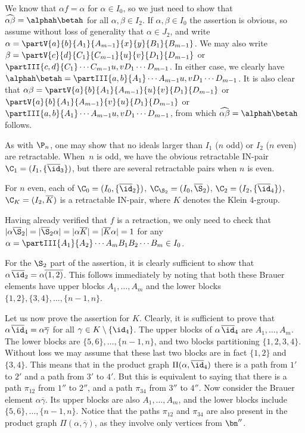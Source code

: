 \pf
We know that $\alpha f=\alpha$ for $\alpha\in I_0$, so we just need to show that $\widehat{\alpha\beta}=\alphah\betah$ for all $\alpha,\beta\in I_2$.
If $\alpha,\beta\in I_0$ the assertion is obvious, so assume without loss of generality that $\alpha\in J_2$,
and write $\alpha = \partV{a}{b}{A_1}{A_{m-1}}{x}{y}{B_1}{B_{m-1}}$.  We may also write $\beta=\partV{c}{d}{C_1}{C_{m-1}}{u}{v}{D_1}{D_{m-1}}$ or $\partIII{c,d}{C_1}\cdots{C_{m-1}}{u,v}{D_1}\cdots{D_{m-1}}$.  In either case, we clearly have $\alphah\betah=\partIII{a,b}{A_1}\cdots{A_{m-1}}{u,v}{D_1}\cdots{D_{m-1}}$.  It is also clear that
$\alpha\beta = \partV{a}{b}{A_1}{A_{m-1}}{u}{v}{D_1}{D_{m-1}}$
or $\partV{a}{b}{A_1}{A_{m-1}}{v}{u}{D_1}{D_{m-1}}$ or~$\partIII{a,b}{A_1}\cdots{A_{m-1}}{u,v}{D_1}\cdots{D_{m-1}}$, from which $\widehat{\alpha\beta}=\alphah\betah$ follows. \epf

As with $\P_n$, one may show that no ideals larger than $I_1$ ($n$ odd) or $I_2$ ($n$ even) are retractable.
%
When~$n$ is odd, we have the obvious retractable IN-pair $\C_1=(I_1,\{\overline\id_3\})$, but there are several retractable pairs when $n$ is even.



\begin{lemma}
\label{BCtriples}
For $n$ even, each of $\C_0=(I_0,\{\overline{\id}_2\})$,
$\C_{\S_2}=(I_0,\overline{\S}_2)$,
$\C_2=(I_2,\{\overline{\id}_4\})$,
$\C_K=(I_2,\overline{K})$
is a retractable IN-pair, where $K$ denotes the Klein 4-group.
\end{lemma}

\pf
Having already verified that $f$ is a retraction, we only need to check that
$|\alpha\overline{\S}_2|=|\overline{\S}_2\alpha|=|\alpha \overline{K}|=|\overline{K}\alpha|=1$ for any
$\alpha=\partIII{A_1}{A_2}\cdots{A_{m}}{B_1}{B_2}\cdots{B_{m}}\in I_0$.

For the $\S_2$ part of the assertion, it is clearly sufficient to show
that $\alpha\;\!\overline{\id}_2=\alpha\overline{(1, 2)}$.
This 
follows immediately by noting that both these Brauer elements have upper blocks $A_1,\dots,A_m$ and the lower blocks $\{1,2\},\{3,4\},\dots,\{n-1,n\}$.

Let us now prove the assertion for $K$.
Clearly, it is sufficient to prove that
$\alpha \;\!\overline{\id}_4=\alpha\overline{\gamma}$
for all $\gamma\in K\setminus\{\id_4\}$.
The upper blocks of $\alpha\;\!\overline{\id}_4$ are $A_1,\dots,A_m$.
The lower blocks are $\{5,6\},\dots,\{n-1,n\}$, and two blocks
partitioning $\{1,2,3,4\}$.
Without loss we may assume that these last two blocks are in fact $\{1,2\}$ and $\{3,4\}$.
This means that in the product graph $\Pi(\alpha,\overline{\id}_4)$
there is a path from $1'$ to $2'$ and a path from $3'$ to $4'$.
But this is equivalent to saying that there is a path $\pi_{12}$ from $1''$ to $2''$, and a path $\pi_{34}$ from $3''$ to $4''$.
%
Now consider the Brauer element $\alpha\overline{\gamma}$.
Its upper blocks are also $A_1,\dots,A_m$, and the lower blocks include $\{5,6\},\dots,\{n-1,n\}$.
Notice that the paths $\pi_{12}$ and $\pi_{34}$ are also present in the product graph $\Pi(\alpha,\overline{\gamma})$, as they involve only vertices from $\bn''$.

